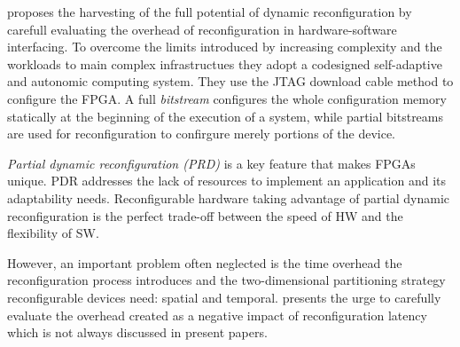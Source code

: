 \cite{reconfigurable} proposes the harvesting of the full potential of dynamic reconfiguration by carefull evaluating the overhead of reconfiguration in hardware-software interfacing. To overcome the limits introduced by increasing complexity and the workloads to main complex infrastructues they adopt a codesigned self-adaptive and autonomic computing system. They use the JTAG download cable method to configure the FPGA. A full \emph{bitstream} configures the whole configuration memory statically at the beginning of the execution of a system, while partial bitstreams are used for reconfiguration to confirgure merely portions of the device.

\emph{Partial dynamic reconfiguration (PRD)} is a key feature that makes FPGAs unique. PDR addresses the lack of resources to implement an application and its adaptability needs. Reconfigurable hardware taking advantage of partial dynamic reconfiguration is the perfect trade-off between the speed of HW and the flexibility of SW. 

However, an important problem often neglected is the time overhead the reconfiguration process introduces and the two-dimensional partitioning strategy reconfigurable devices need: spatial and temporal. \cite{reconfigurable} presents the urge to carefully evaluate the overhead created as a negative impact of reconfiguration latency which is not always discussed in present papers. 